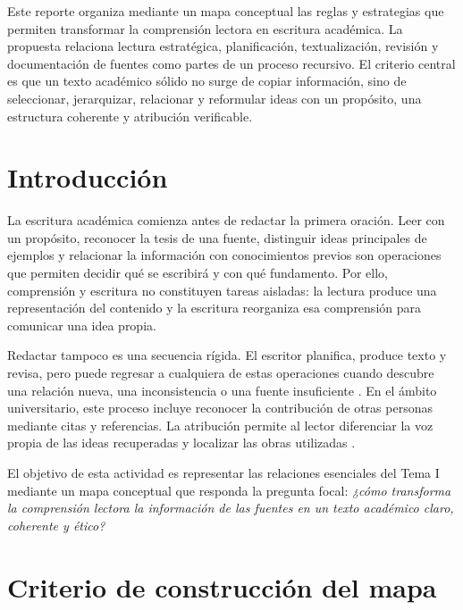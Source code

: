 \documentclass[spanish,letterpaper,oneside]{article}
\begin{document}
\templatePortrait
\templatePagecfg
\onehalfspacing

\begin{abstractd}
Este reporte organiza mediante un mapa conceptual las reglas y estrategias que permiten transformar la comprensión lectora en escritura académica. La propuesta relaciona lectura estratégica, planificación, textualización, revisión y documentación de fuentes como partes de un proceso recursivo. El criterio central es que un texto académico sólido no surge de copiar información, sino de seleccionar, jerarquizar, relacionar y reformular ideas con un propósito, una estructura coherente y atribución verificable.
\end{abstractd}

\templateIndex
\templateFinalcfg

\section{Introducción}

La escritura académica comienza antes de redactar la primera oración. Leer con un propósito, reconocer la tesis de una fuente, distinguir ideas principales de ejemplos y relacionar la información con conocimientos previos son operaciones que permiten decidir qué se escribirá y con qué fundamento. Por ello, comprensión y escritura no constituyen tareas aisladas: la lectura produce una representación del contenido y la escritura reorganiza esa comprensión para comunicar una idea propia.

Redactar tampoco es una secuencia rígida. El escritor planifica, produce texto y revisa, pero puede regresar a cualquiera de estas operaciones cuando descubre una relación nueva, una inconsistencia o una fuente insuficiente \citep{flowerHayesCognitiveProcess1981}. En el ámbito universitario, este proceso incluye reconocer la contribución de otras personas mediante citas y referencias. La atribución permite al lector diferenciar la voz propia de las ideas recuperadas y localizar las obras utilizadas \citep{apaCitasTexto2024,apaReferencias2023}.

El objetivo de esta actividad es representar las relaciones esenciales del Tema I mediante un mapa conceptual que responda la pregunta focal: \textit{¿cómo transforma la comprensión lectora la información de las fuentes en un texto académico claro, coherente y ético?}

\section{Criterio de construcción del mapa}
\end{document}
